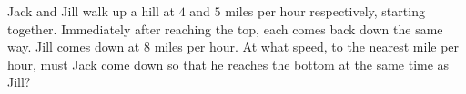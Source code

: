 Jack and Jill walk up a hill at $4$ and $5$ miles per hour respectively, starting together. Immediately after reaching the top, each comes back down the same way. Jill comes down at $8$ miles per hour. At what speed, to the nearest mile per hour, must Jack come down so that he reaches the bottom at the same time as Jill?
